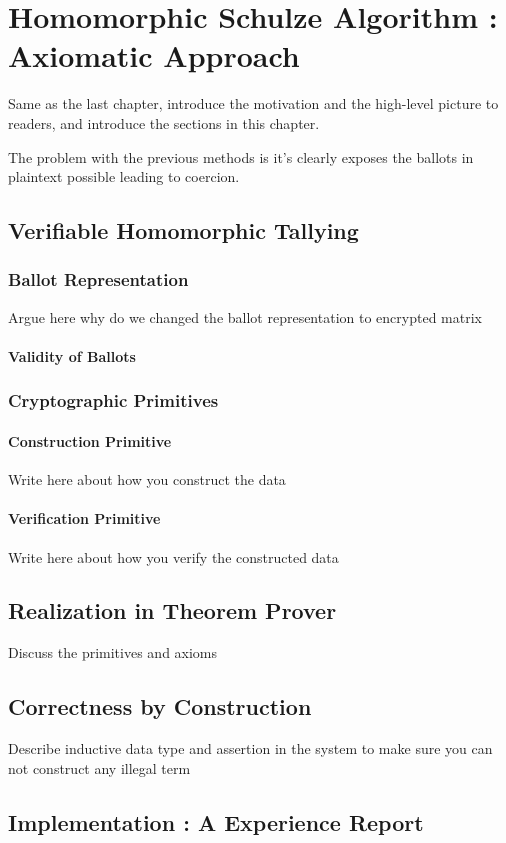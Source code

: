 \chapter{Homomorphic Schulze Algorithm : Axiomatic Approach}
\label{cha:homormorphic_schulze}
Same as the last chapter, introduce the motivation and the high-level picture to
readers, and introduce the sections in this chapter. 

The problem with the previous methods is it's clearly exposes the ballots 
in plaintext possible leading to coercion. 

\section{Verifiable Homomorphic Tallying}
  \subsection{Ballot Representation}
     Argue here why do we changed the ballot representation 
     to encrypted matrix
     \subsubsection{Validity of Ballots}
  \subsection{Cryptographic Primitives}
  	\subsubsection{Construction Primitive}
  	  Write here about how you construct the data
  	\subsubsection{Verification Primitive}
  	  Write here about how you verify the constructed 
  	  data

\section{Realization in Theorem Prover}
    Discuss the primitives and axioms
\section{Correctness by Construction}
  Describe inductive data type and assertion in the 
  system to make sure you can not construct any 
  illegal term
\section{Implementation : A Experience Report}
